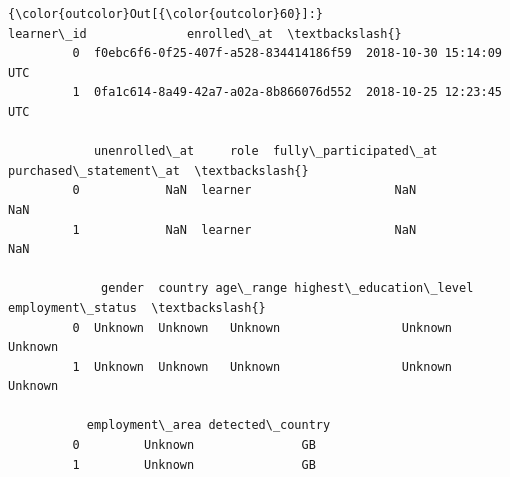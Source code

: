 \documentclass[11pt]{article}
\begin{document}
\begin{Verbatim}[commandchars=\\\{\}]
{\color{outcolor}Out[{\color{outcolor}60}]:}                              learner\_id              enrolled\_at  \textbackslash{}
         0  f0ebc6f6-0f25-407f-a528-834414186f59  2018-10-30 15:14:09 UTC   
         1  0fa1c614-8a49-42a7-a02a-8b866076d552  2018-10-25 12:23:45 UTC   
         
            unenrolled\_at     role  fully\_participated\_at  purchased\_statement\_at  \textbackslash{}
         0            NaN  learner                    NaN                     NaN   
         1            NaN  learner                    NaN                     NaN   
         
             gender  country age\_range highest\_education\_level employment\_status  \textbackslash{}
         0  Unknown  Unknown   Unknown                 Unknown           Unknown   
         1  Unknown  Unknown   Unknown                 Unknown           Unknown   
         
           employment\_area detected\_country  
         0         Unknown               GB  
         1         Unknown               GB  
\end{Verbatim}
            
\end{document}
